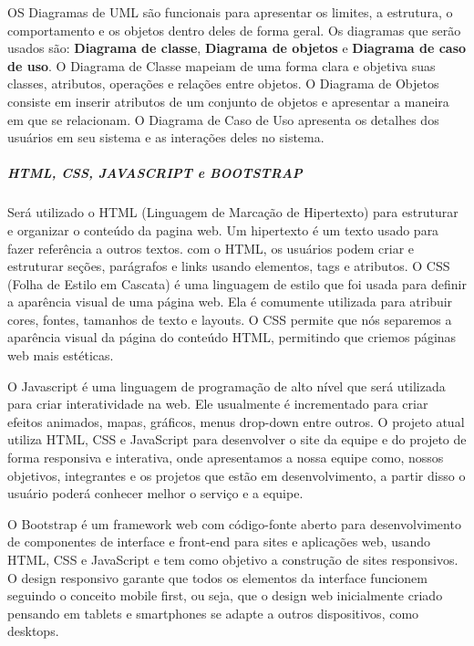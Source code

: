 OS Diagramas de UML são funcionais para apresentar os limites, a estrutura, o comportamento e os objetos dentro deles de forma geral. Os diagramas que serão usados são: \textbf{Diagrama de classe}, \textbf{Diagrama de objetos} e \textbf{Diagrama de caso de uso}\cite{lucidchart2024}. O Diagrama de Classe mapeiam de uma forma clara e objetiva suas classes, atributos, operações e relações entre objetos\cite{lucidchart12024}. O Diagrama de Objetos consiste em inserir atributos de um conjunto de objetos e apresentar a maneira em que se relacionam\cite{lucidchart22024}. O Diagrama de Caso de Uso apresenta os detalhes dos usuários em seu sistema e as interações deles no sistema\cite{lucidchart32024}. 

\subparagraph*{\textbf{HTML, CSS, JAVASCRIPT e BOOTSTRAP}}

Será utilizado o HTML (Linguagem de Marcação de Hipertexto) para estruturar e organizar o conteúdo da pagina web. Um hipertexto é um texto usado para fazer referência a outros textos. com o HTML, os usuários podem criar e estruturar seções, parágrafos e links usando elementos, tags e atributos\cite{longen2023}.  
O CSS (Folha de Estilo em Cascata) é uma linguagem de estilo que foi usada para definir a aparência visual de uma página web. Ela é comumente utilizada para atribuir cores, fontes, tamanhos de texto e layouts. O CSS permite que nós separemos a aparência visual da página do conteúdo HTML, permitindo que criemos páginas web mais estéticas\cite{ariane2022}. 

O Javascript é uma linguagem de programação de alto nível que será utilizada para criar interatividade na web. Ele usualmente é incrementado para criar efeitos animados, mapas, gráficos, menus drop-down entre outros. O projeto atual utiliza HTML, CSS e JavaScript para desenvolver o site da equipe e do projeto de forma responsiva e interativa, onde apresentamos a nossa equipe como, nossos objetivos, integrantes e os projetos que estão em desenvolvimento, a partir disso o usuário poderá conhecer melhor o serviço e a equipe\cite{carlos2023}. 

O Bootstrap é um framework web com código-fonte aberto para desenvolvimento de componentes de interface e front-end para sites e aplicações web, usando HTML, CSS e JavaScript e tem como objetivo a construção de sites responsivos. O design responsivo garante que todos os elementos da interface funcionem seguindo o conceito mobile first, ou seja, que o design web inicialmente criado pensando em tablets e smartphones se adapte a outros dispositivos, como desktops\cite{ebac2023}. 


